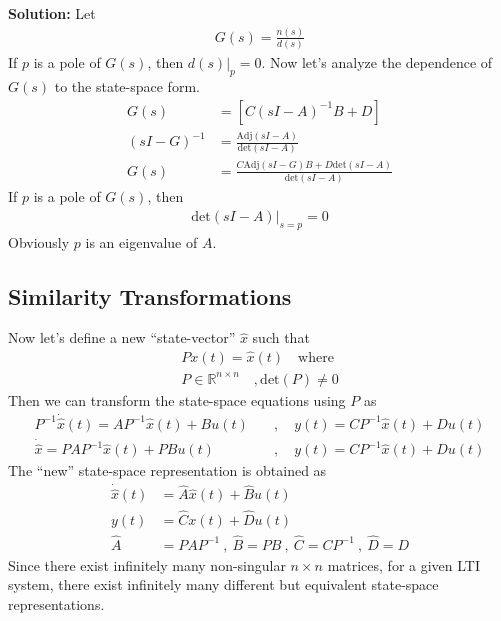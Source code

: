 \documentclass[twoside]{article}
\begin{document}
\textbf{Solution:} Let 
%
\begin{align*}
  G(s) = \frac{n(s)}{d(s)}
\end{align*}
%
If $p$ is a pole of $G(s)$, then $d(s)|_{p} = 0$. Now let's analyze
the dependence of $G(s)$ to the state-space form. 
%
\begin{align*}
  G(s) &= \left[ C \left(s I - A \right)^{-1} B + D \right]
\\
  \left(s I - G \right)^{-1} &= 
\frac{\mathrm{Adj} \left(s I - A \right) }{\mathrm{det} \left(s I - A
                               \right) }
\\
 G(s) &= \frac{C \mathrm{Adj} \left(s I - G \right) B + D \mathrm{det}
        \left(s I - A
                               \right)}{\mathrm{det} \left(s I - A
                               \right) }
\end{align*}
%
If $p$ is a pole of $G(s)$, then 
%
\begin{align*}
\mathrm{det} \left(s I - A \right)|_{s = p} = 0
\end{align*}
%
Obviously $p$ is an eigenvalue of $A$.


\subsection{Similarity Transformations}

Now let's define a new ``state-vector'' $\hat{x}$ such that
%
\begin{align*}
  P x(t) = \hat{x}(t) \quad \mathrm{where}
\\
  P \in \mathbb{R}^{n \times n} \quad , \mathrm{det}(P) \neq 0
\end{align*}
%
Then we can transform the state-space equations using $P$ as
%
\begin{align*}
  P^{-1} \dot{\hat{x}}(t) = A P^{-1} \hat{x}(t) + B u(t) 
\quad &, \quad y(t) = C P^{-1} \hat{x}(t) + D u(t)
\\
  \dot{\hat{x}} = P A P^{-1} \hat{x}(t)+ P B u(t)
\quad &, \quad y(t) = C P^{-1} \hat{x}(t) + D u(t)
\end{align*}
%
The ``new'' state-space representation is obtained as
%
\begin{align*}
  \dot{\hat{x}}(t)  &= \hat{A} \hat{x}(t) + \hat{B} u(t)
    \\
  y(t) &= \hat{C} x(t) + \hat{D} u(t)
\\
\hat{A} &= P  A P^{-1} \ , \ \hat{B} = P  B \ , \ \hat{C} = C P^{-1} \ ,
  \ \hat{D} = D
\end{align*}
%
Since there exist infinitely many non-singular $n \times n$
matrices, for a given LTI system, there exist infinitely 
many different but equivalent state-space representations.
\end{document}
